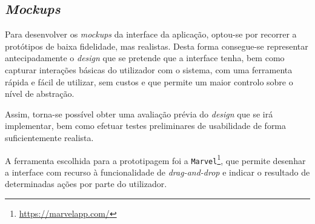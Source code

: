\subsection{\textit{Mockups}}

Para desenvolver os \textit{mockups} da interface da aplicação, optou-se por recorrer a protótipos de baixa fidelidade, mas realistas. Desta forma consegue-se representar antecipadamente o \textit{design} que se pretende que a interface tenha, bem como capturar interações básicas do utilizador com o sistema, com uma ferramenta rápida e fácil de utilizar, sem custos e que permite um maior controlo sobre o nível de abstração.

Assim, torna-se possível obter uma avaliação prévia do \textit{design} que se irá implementar, bem como efetuar testes preliminares de usabilidade de forma suficientemente realista.

A ferramenta escolhida para a prototipagem foi a \texttt{Marvel}\footnote{\url{https://marvelapp.com/}}, que permite desenhar a interface com recurso à funcionalidade de \textit{drag-and-drop} e indicar o resultado de determinadas ações por parte do utilizador. 


